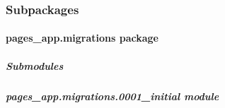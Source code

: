 \documentclass[letterpaper,10pt,english]{sphinxmanual}
\begin{document}
\subsubsection{Subpackages}
\label{\detokenize{pages_app:subpackages}}
\sphinxstepscope


\paragraph{pages\_app.migrations package}
\label{\detokenize{pages_app.migrations:pages-app-migrations-package}}\label{\detokenize{pages_app.migrations::doc}}

\subparagraph{Submodules}
\label{\detokenize{pages_app.migrations:submodules}}

\subparagraph{pages\_app.migrations.0001\_initial module}
\label{\detokenize{pages_app.migrations:module-pages_app.migrations.0001_initial}}\label{\detokenize{pages_app.migrations:pages-app-migrations-0001-initial-module}}
\end{document}
